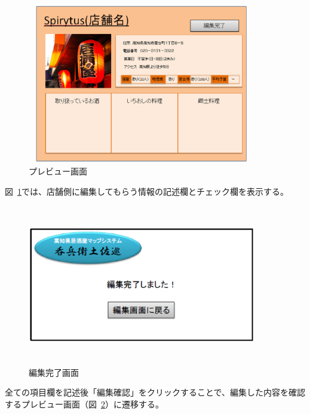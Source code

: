 \documentclass[a4j,titlepage]{jarticle}
\begin{document}
\begin {figure}[!htbp]
    \begin{center}
    \includegraphics [height=7cm, width=10cm]{49.eps}
    \caption {プレビュー画面}
    \label {fig:49}
    \end{center}
\end {figure}





図~\ref{fig:49}では、店舗側に編集してもらう情報の記述欄とチェック欄を表示する。



\begin {figure}[!htbp]
    \begin{center}
    \includegraphics [height=7cm, width=10cm]{50.eps}
    \caption {編集完了画面}
    \label {fig:50}
    \end{center}
\end {figure}



全ての項目欄を記述後「編集確認」をクリックすることで、編集した内容を確認するプレビュー画面（図~\ref{fig:50}）に遷移する。
\end{document}
